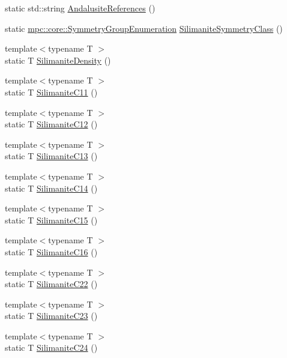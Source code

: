 \begin{DoxyCompactItemize}
static std\+::string \mbox{\hyperlink{namespacempc_1_1data_a76a4da7b87edda283a5fe373d6bfb237}{Andalusite\+References}} ()
\item 
static \mbox{\hyperlink{namespacempc_1_1core_a9d979684062547055a0ef5c13077bad8}{mpc\+::core\+::\+Symmetry\+Group\+Enumeration}} \mbox{\hyperlink{namespacempc_1_1data_a9f7ee0e6670cb4d6c094ec76116775dd}{Silimanite\+Symmetry\+Class}} ()
\item 
{\footnotesize template$<$typename T $>$ }\\static T \mbox{\hyperlink{namespacempc_1_1data_ac0cb8a43cf54651d5a71bf932f83517d}{Silimanite\+Density}} ()
\item 
{\footnotesize template$<$typename T $>$ }\\static T \mbox{\hyperlink{namespacempc_1_1data_a4ec355be073aed9bf4ed97660b8635e9}{Silimanite\+C11}} ()
\item 
{\footnotesize template$<$typename T $>$ }\\static T \mbox{\hyperlink{namespacempc_1_1data_a0397484ed7dff59be86101d522727ff7}{Silimanite\+C12}} ()
\item 
{\footnotesize template$<$typename T $>$ }\\static T \mbox{\hyperlink{namespacempc_1_1data_a4e25a14210d22ed424934847ea4c69b2}{Silimanite\+C13}} ()
\item 
{\footnotesize template$<$typename T $>$ }\\static T \mbox{\hyperlink{namespacempc_1_1data_ad0ed86e6150b861deed2f8486b19696a}{Silimanite\+C14}} ()
\item 
{\footnotesize template$<$typename T $>$ }\\static T \mbox{\hyperlink{namespacempc_1_1data_aefb27e4cd693bfda6bb35e866110d16c}{Silimanite\+C15}} ()
\item 
{\footnotesize template$<$typename T $>$ }\\static T \mbox{\hyperlink{namespacempc_1_1data_a2bba13eae8378d279db40209c529827a}{Silimanite\+C16}} ()
\item 
{\footnotesize template$<$typename T $>$ }\\static T \mbox{\hyperlink{namespacempc_1_1data_ae5b18e375f4c7aac93a36ff30bb2e72a}{Silimanite\+C22}} ()
\item 
{\footnotesize template$<$typename T $>$ }\\static T \mbox{\hyperlink{namespacempc_1_1data_a0630c892166ecad27afc5a33ba5b9b42}{Silimanite\+C23}} ()
\item 
{\footnotesize template$<$typename T $>$ }\\static T \mbox{\hyperlink{namespacempc_1_1data_aa6c36703d055d6dc7801f66055b8431b}{Silimanite\+C24}} ()

\end{DoxyCompactItemize}
